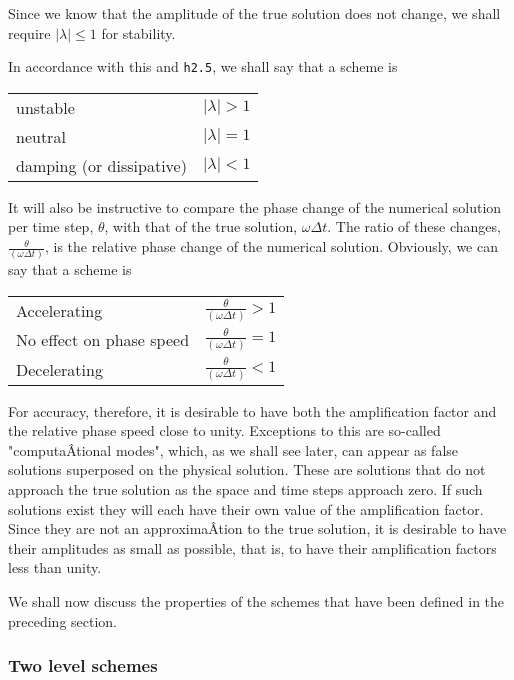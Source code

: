 Since we know that the amplitude of the true solution does not change,
we shall require \(| \lambda | \leq 1\) for stability.

In accordance with this and \texttt{h2.5}, we shall say that a scheme is

\begin{longtable}[]{@{}ll@{}}
\toprule\noalign{}
\endhead
\bottomrule\noalign{}
\endlastfoot
unstable & \(| \lambda | > 1\) \\
neutral & \(| \lambda | = 1\) \\
damping (or dissipative) & \(| \lambda | < 1\) \\
\end{longtable}

It will also be instructive to compare the phase change of the numerical
solution per time step, \(\theta\), with that of the true solution,
\(\omega\Delta t\). The ratio of these changes,
\(\frac{\theta}{(\omega \Delta t)}\), is the relative phase change of
the numerical solution. Obviously, we can say that a scheme is

\begin{longtable}[]{@{}ll@{}}
\toprule\noalign{}
\endhead
\bottomrule\noalign{}
\endlastfoot
Accelerating & \(\frac{\theta}{(\omega \Delta t)} > 1\) \\
No effect on phase speed & \(\frac{\theta}{(\omega \Delta t)} = 1\) \\
Decelerating & \(\frac{\theta}{(\omega \Delta t)} < 1\) \\
\end{longtable}

For accuracy, therefore, it is desirable to have both the amplification
factor and the relative phase speed close to unity. Exceptions to this
are so-called "computaÂ­tional modes", which, as we shall see later, can
appear as false solutions superposed on the physical solution. These are
solutions that do not approach the true solution as the space and time
steps approach zero. If such solutions exist they will each have their
own value of the amplification factor. Since they are not an
approximaÂ­tion to the true solution, it is desirable to have their
amplitudes as small as possible, that is, to have their amplification
factors less than unity.

We shall now discuss the properties of the schemes that have been
defined in the preceding section.

\subsubsection{Two level schemes}\label{two-level-schemes-1}

